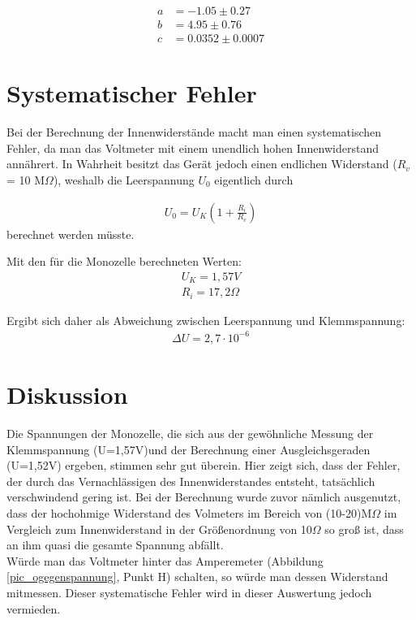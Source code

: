 \begin{align*}
a &= -1.05 \pm 0.27    \\
b &= 4.95 \pm 0.76      \\
c &= 0.0352 \pm 0.0007   
\end{align*}

\section{Systematischer Fehler}
Bei der Berechnung der Innenwiderstände macht man einen systematischen Fehler, da man das Voltmeter mit einem unendlich hohen Innenwiderstand annährert. In Wahrheit besitzt das Gerät jedoch einen endlichen Widerstand ($R_v$ = 10 M$\Omega$), weshalb die Leerspannung $U_0$ eigentlich durch

\begin{align}
U_0 = U_K \left(1 + \frac{R_i}{R_v} \right)
\end{align}
berechnet werden müsste.

Mit den für die Monozelle berechneten Werten:
\begin{align*}
U_K=1,57V\\
R_i=17,2 \Omega
\end{align*}

Ergibt sich daher als Abweichung zwischen Leerspannung und Klemmspannung:
\begin{align*}
\Delta U = 2,7\cdot 10^{-6}
\end{align*}

\section{Diskussion}
Die Spannungen der Monozelle, die sich aus der gewöhnliche Messung der Klemmspannung (U=1,57V)und der Berechnung einer Ausgleichsgeraden (U=1,52V) ergeben, stimmen sehr gut überein. Hier zeigt sich, dass der Fehler, der durch das Vernachlässigen des Innenwiderstandes entsteht, tatsächlich verschwindend gering ist. Bei der Berechnung wurde zuvor nämlich ausgenutzt, dass der hochohmige Widerstand des Volmeters im Bereich von (10-20)M$\Omega$ im Vergleich zum Innenwiderstand in der Größenordnung von 10$\Omega$ so groß ist, dass an ihm quasi die gesamte Spannung abfällt.\\

Würde man das Voltmeter hinter das Amperemeter (Abbildung \ref{pic_ogegenspannung}, Punkt H) schalten, so würde man dessen Widerstand mitmessen. Dieser systematische Fehler wird in dieser Auswertung jedoch vermieden.\\

